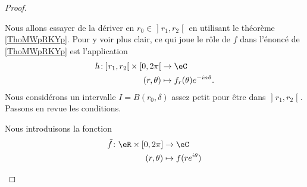 \begin{proof}
\begin{subproof}
			Nous allons essayer de la dériver en \( r_0\in \mathopen] r_1 , r_2 \mathclose[\) en utilisant le théorème \ref{ThoMWpRKYp}. Pour y voir plus clair, ce qui joue le rôle de \( f\) dans l'énoncé de \ref{ThoMWpRKYp} est l'application
			\begin{equation}
				\begin{aligned}
					h\colon \mathopen] r_1 , r_2 \mathclose[\times \mathopen[ 0 , 2\pi \mathclose[ & \to \eC                             \\
					(r,\theta)                                                                     & \mapsto  f_r(\theta) e^{-in\theta}.
				\end{aligned}
			\end{equation}
			Nous considérons un intervalle \( I=B(r_0,\delta)\) assez petit pour être dans \( \mathopen] r_1 , r_2 \mathclose[\). Passons en revue les conditions.
			\begin{subproof}

				Nous introduisons la fonction
				\begin{equation}
					\begin{aligned}
						\tilde  f\colon \eR\times \mathopen[ 0,2\pi\mathclose] & \to \eC                 \\
						(r,\theta)                                             & \mapsto f(re^{i\theta})
					\end{aligned}
				\end{equation}


\end{subproof}
\end{subproof}
\end{proof}

